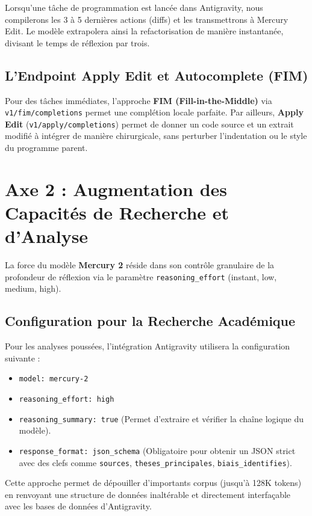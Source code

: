 \documentclass[12pt,a4paper]{article}
\begin{document}
\begin{infobox}
Lorsqu'une tâche de programmation est lancée dans Antigravity, nous compilerons les 3 à 5 dernières actions (diffs) et les transmettrons à Mercury Edit. Le modèle extrapolera ainsi la refactorisation de manière instantanée, divisant le temps de réflexion par trois.
\end{infobox}

\subsection{L'Endpoint Apply Edit et Autocomplete (FIM)}
Pour des tâches immédiates, l'approche \textbf{FIM (Fill-in-the-Middle)} via \texttt{v1/fim/completions} permet une complétion locale parfaite. Par ailleurs, \textbf{Apply Edit} (\texttt{v1/apply/completions}) permet de donner un code source et un extrait modifié à intégrer de manière chirurgicale, sans perturber l'indentation ou le style du programme parent.

\section{Axe 2 : Augmentation des Capacités de Recherche et d'Analyse}

La force du modèle \textbf{Mercury 2} réside dans son contrôle granulaire de la profondeur de réflexion via le paramètre \texttt{reasoning\_effort} (instant, low, medium, high). 

\subsection{Configuration pour la Recherche Académique}
Pour les analyses poussées, l'intégration Antigravity utilisera la configuration suivante :
\begin{itemize}
    \item \texttt{model: mercury-2}
    \item \texttt{reasoning\_effort: high}
    \item \texttt{reasoning\_summary: true} (Permet d'extraire et vérifier la chaîne logique du modèle).
    \item \texttt{response\_format: json\_schema} (Obligatoire pour obtenir un JSON strict avec des clefs comme \texttt{sources}, \texttt{theses\_principales}, \texttt{biais\_identifies}).
\end{itemize}

Cette approche permet de dépouiller d'importants corpus (jusqu'à 128K tokens) en renvoyant une structure de données inaltérable et directement interfaçable avec les bases de données d'Antigravity.
\end{document}
